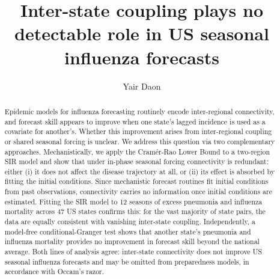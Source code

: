 \documentclass[9pt,twocolumn,twoside]{pnas-new}
\begin{document}
\title{Inter-state coupling plays no detectable role in US seasonal influenza forecasts}

\author[a,1]{Yair Daon}








\begin{abstract}
Epidemic models for influenza forecasting routinely encode
inter-regional connectivity, and forecast skill appears to improve
when one state's lagged incidence is used as a covariate for
another's. Whether this improvement arises from inter-regional
coupling or shared seasonal forcing is unclear. We address this
question via two complementary approaches. Mechanistically, we apply
the Cram\'er-Rao Lower Bound to a two-region SIR model and show that
under in-phase seasonal forcing connectivity is redundant: either (i)
it does not affect the disease trajectory at all, or (ii) its effect
is absorbed by fitting the initial conditions. Since mechanistic
forecast routines fit initial conditions from past observations,
connectivity carries no information once initial conditions are
estimated. Fitting the SIR model to 12 seasons of excess pneumonia and
influenza mortality across 47 US states confirms this: for the vast
majority of state pairs, the data are equally consistent with
vanishing inter-state coupling. Independently, a model-free
conditional-Granger test shows that another state's pneumonia and
influenza mortality provides no improvement in forecast skill beyond
the national average. Both lines of analysis agree: inter-state
connectivity does not improve US seasonal influenza forecasts and may
be omitted from preparedness models, in accordance with Occam's razor.
\end{abstract}
\end{document}
